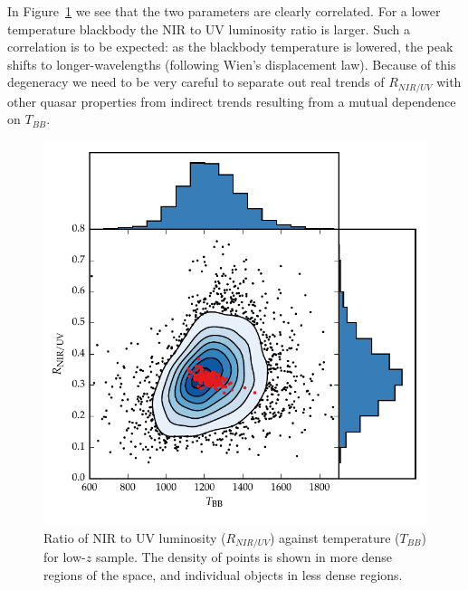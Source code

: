 
In Figure~\ref{fig:ratio_tbb_density} we see that the two parameters are clearly correlated. 
For a lower temperature blackbody the NIR to UV luminosity ratio is larger. 
Such a correlation is to be expected: as the blackbody temperature is lowered, the peak shifts to longer-wavelengths (following Wien's displacement law). 
Because of this degeneracy we need to be very careful to separate out real trends of $R_{NIR/UV}$ with other quasar properties from indirect trends resulting from a mutual dependence on $T_{BB}$.  

\begin{figure}
  \centering
  \includegraphics[width=\textwidth]{figures/chapter05/ratio_tbb_density.pdf}
  \caption[{Ratio of NIR to UV luminosity ($R_{NIR/UV}$) against temperature ($T_{BB}$) for low-$z$ sample.}]{Ratio of NIR to UV luminosity ($R_{NIR/UV}$) against temperature ($T_{BB}$) for low-$z$ sample. The density of points is shown in more dense regions of the space, and individual objects in less dense regions. }
  \label{fig:ratio_tbb_density}
\end{figure}


